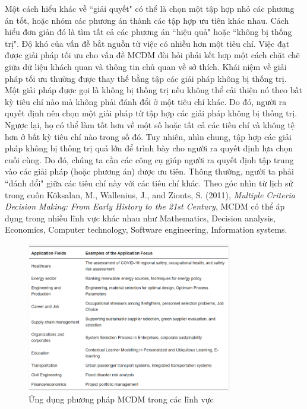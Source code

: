 Một cách hiểu khác về ``giải quyết" có thể là chọn một tập hợp nhỏ các phương án tốt, hoặc nhóm các phương án thành các tập hợp ưu tiên khác nhau. Cách hiểu đơn giản đó là tìm tất cả các phương án ``hiệu quả" hoặc ``không bị thống trị". Độ khó của vấn đề bắt nguồn từ việc có nhiều hơn một tiêu chí. Việc đạt được giải pháp tối ưu cho vấn đề MCDM đòi hỏi phải kết hợp một cách chặt chẽ giữa dữ liệu khách quan và thông tin chủ quan về sở thích. Khái niệm về giải pháp tối ưu thường được thay thế bằng tập các giải pháp không bị thống trị. Một giải pháp được gọi là không bị thống trị nếu không thể cải thiện nó theo bất kỳ tiêu chí nào mà không phải đánh đổi ở một tiêu chí khác. Do đó, người ra quyết định nên chọn một giải pháp từ tập hợp các giải pháp không bị thống trị. Ngược lại, họ có thể làm tốt hơn về một số hoặc tất cả các tiêu chí và không tệ hơn ở bất kỳ tiêu chí nào trong số đó. Tuy nhiên, nhìn chung, tập hợp các giải pháp không bị thống trị quá lớn để trình bày cho người ra quyết định lựa chọn cuối cùng. Do đó, chúng ta cần các công cụ giúp người ra quyết định tập trung vào các giải pháp (hoặc phương án) được ưu tiên. Thông thường, người ta phải ``đánh đổi" giữa các tiêu chí này với các tiêu chí khác. Theo góc nhìn từ lịch sử trong cuốn Köksalan, M., Wallenius, J., and Zionts, S. (2011), \textit{Multiple Criteria Decision Making: From Early History to the 21st Century}, MCDM có thể áp dụng trong nhiều lĩnh vực khác nhau như Mathematics, Decision analysis, Economics, Computer technology, Software engineering, Information systems. 

\begin{figure}[H]
    \centering
    \includegraphics[width=0.8\textwidth]{images/chap2/MCDM.png}
    \vspace{0.5cm}
    \caption{Ứng dụng phương pháp MCDM trong các lĩnh vực}
\end{figure}

